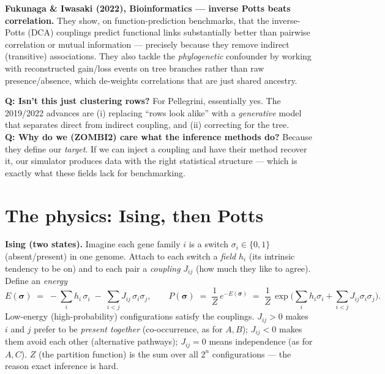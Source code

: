 \documentclass[11pt, oneside]{article}
\newcommand{\sig}{\boldsymbol{\sigma}}
\begin{document}
\textbf{Fukunaga \& Iwasaki (2022), Bioinformatics --- inverse Potts beats correlation.} They
show, on function-prediction benchmarks, that the inverse-Potts (DCA) couplings predict
functional links substantially better than pairwise correlation or mutual information ---
precisely because they remove indirect (transitive) associations. They also tackle the
\emph{phylogenetic} confounder by working with reconstructed gain/loss events on tree branches
rather than raw presence/absence, which de-weights correlations that are just shared ancestry.

\begin{faqbox}
\textbf{Q: Isn't this just clustering rows?} For Pellegrini, essentially yes. The 2019/2022
advances are (i) replacing ``rows look alike'' with a \emph{generative} model that separates
direct from indirect coupling, and (ii) correcting for the tree.\\[2pt]
\textbf{Q: Why do we (ZOMBI2) care what the inference methods do?} Because they define our
\emph{target}. If we can inject a coupling and have their method recover it, our simulator
produces data with the right statistical structure --- which is exactly what these fields lack
for benchmarking.
\end{faqbox}

\section{The physics: Ising, then Potts}

\textbf{Ising (two states).} Imagine each gene family $i$ is a switch $\sigma_i\in\{0,1\}$
(absent/present) in one genome. Attach to each switch a \emph{field} $h_i$ (its intrinsic
tendency to be on) and to each pair a \emph{coupling} $J_{ij}$ (how much they like to agree).
Define an \emph{energy}
\[
E(\sig) \;=\; -\sum_i h_i\,\sigma_i \;-\; \sum_{i<j} J_{ij}\,\sigma_i\sigma_j ,
\qquad
P(\sig) \;=\; \frac{1}{Z}\,e^{-E(\sig)} \;=\; \frac{1}{Z}\,
\exp\!\Big(\textstyle\sum_i h_i\sigma_i + \sum_{i<j} J_{ij}\sigma_i\sigma_j\Big).
\]
Low-energy (high-probability) configurations satisfy the couplings. $J_{ij}>0$ makes $i$ and
$j$ prefer to be \emph{present together} (co-occurrence, as for $A,B$); $J_{ij}<0$ makes them
avoid each other (alternative pathways); $J_{ij}=0$ means independence (as for $A,C$). $Z$ (the
partition function) is the sum over all $2^n$ configurations --- the reason exact inference is
hard.
\end{document}
